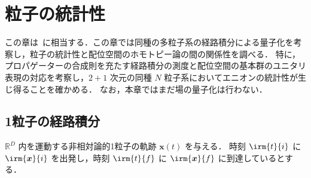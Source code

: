 \documentclass[TQFT_main]{subfiles}
\begin{document}

\chapter{粒子の統計性}

この章は~\cite[Chapter3, 4]{Simon2021}に相当する．この章では同種の多粒子系の経路積分による量子化を考察し，粒子の統計性と配位空間のホモトピー論の間の関係性を調べる．
特に，プロパゲーターの合成則を充たす経路積分の測度と配位空間の基本群のユニタリ表現の対応を考察し，$2+1$ 次元の同種 $N$ 粒子系においてエニオンの統計性が生じ得ることを確かめる．
なお，本章ではまだ場の量子化は行わない．

\section{1粒子の経路積分}

$\mathbb{R}^D$ 内を運動する非相対論的1粒子の軌跡 $\bm{x}(t)$ を与える．
時刻 $\irm{t}{i}$ に $\irm{\bm{x}}{i}$ を出発し，時刻 $\irm{t}{f}$ に $\irm{\bm{x}}{f}$ に到達しているとする．
\end{document}
